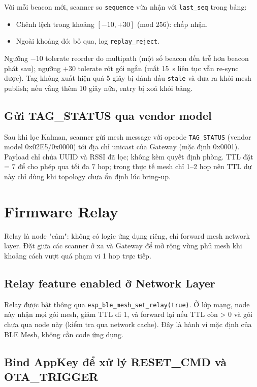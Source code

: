 Với mỗi beacon mới, scanner so \texttt{sequence} vừa nhận với \texttt{last\_seq} trong bảng:

\begin{itemize}
    \item Chênh lệch trong khoảng $[-10, +30]$ (mod 256): chấp nhận.
    \item Ngoài khoảng đó: bỏ qua, log \texttt{replay\_reject}.
\end{itemize}

Ngưỡng $-10$ tolerate reorder do multipath (một số beacon đến trễ hơn beacon phát sau); ngưỡng $+30$ tolerate rớt gói ngắn (mất 15~s liên tục vẫn re-sync được). Tag không xuất hiện quá 5 giây bị đánh dấu \texttt{stale} và đưa ra khỏi mesh publish; nếu vắng thêm 10 giây nữa, entry bị xoá khỏi bảng.

\subsection{Gửi TAG\_STATUS qua vendor model}

Sau khi lọc Kalman, scanner gửi mesh message với opcode \texttt{TAG\_STATUS} (vendor model 0x02E5/0x0000) tới địa chỉ unicast của Gateway (mặc định 0x0001). Payload chỉ chứa UUID và RSSI đã lọc; không kèm quyết định phòng. TTL đặt = 7 để cho phép qua tối đa 7 hop; trong thực tế mesh chỉ 1--2 hop nên TTL dư này chỉ dùng khi topology chưa ổn định lúc bring-up.

\section{Firmware Relay}

Relay là node "câm": không có logic ứng dụng riêng, chỉ forward mesh network layer. Đặt giữa các scanner ở xa và Gateway để mở rộng vùng phủ mesh khi khoảng cách vượt quá phạm vi 1 hop trực tiếp.

\subsection{Relay feature enabled ở Network Layer}

Relay được bật thông qua \texttt{esp\_ble\_mesh\_set\_relay(true)}. Ở lớp mạng, node này nhận mọi gói mesh, giảm TTL đi 1, và forward lại nếu TTL còn > 0 và gói chưa qua node này (kiểm tra qua network cache). Đây là hành vi mặc định của BLE Mesh, không cần code ứng dụng.

\subsection{Bind AppKey để xử lý RESET\_CMD và OTA\_TRIGGER}

